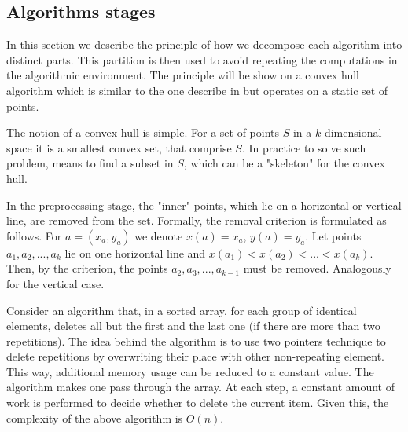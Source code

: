 \documentclass[conference]{IEEEtran}
\theoremstyle{plane}
\begin{document}
\subsection{Algorithms stages}



		In this section we describe the principle of how we decompose each algorithm into distinct parts. This partition is then used to avoid repeating the computations in the algorithmic environment. The principle will be show on a convex hull algorithm which is similar to the one describe in \cite{overmars} but operates on a static set of points.
		
		The notion of a convex hull is simple. For a set of points $S$ in a $k$-dimensional space it is a smallest convex set, that comprise $S$. In practice to solve such problem, means to find a subset in $S$, which can be a "skeleton" for the convex hull.


		In the preprocessing stage, the "inner" points, which lie on a horizontal or vertical line, are removed from the set. Formally, the removal criterion is formulated as follows. For $a = (x_a, y_a)$ we denote $x(a)=x_a$, $y(a)=y_a$. Let points $a_1, a_2, ..., a_k$ lie on one horizontal line and $x(a_1) < x(a_2) <... <x (a_k) $. Then, by the criterion, the points $a_2, a_3, ..., a_{k-1}$ must be removed. Analogously for the vertical case.
		
		Consider an algorithm that, in a sorted array, for each group of identical elements, deletes all but the first and the last one (if there are more than two repetitions). The idea behind the algorithm is to use two pointers technique to delete repetitions by overwriting their place with other non-repeating element. This way, additional memory usage can be reduced to a constant value. The algorithm makes one pass through the array. At each step, a constant amount of work is performed to decide whether to delete the current item. Given this, the complexity of the above algorithm is $O(n)$.
		
\end{document}

